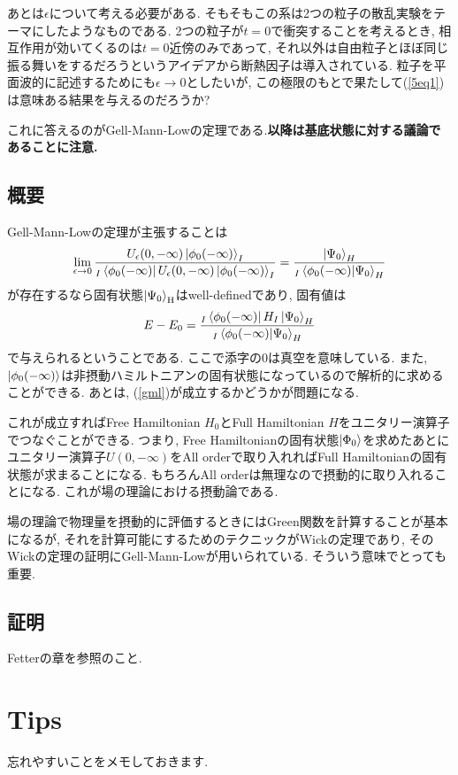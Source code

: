 \documentclass[10.5pt,a4paper]{jreport}
\begin{document}
あとは$\epsilon$について考える必要がある. そもそもこの系は2つの粒子の散乱実験をテーマにしたようなものである. 2つの粒子が$t = 0$で衝突することを考えるとき, 相互作用が効いてくるのは$t = 0$近傍のみであって, それ以外は自由粒子とほぼ同じ振る舞いをするだろうというアイデアから断熱因子は導入されている. 粒子を平面波的に記述するためにも$\epsilon\rightarrow 0$としたいが, この極限のもとで果たして(\ref{5eq1})は意味ある結果を与えるのだろうか?

これに答えるのがGell-Mann-Lowの定理である.\textbf{以降は基底状態に対する議論であることに注意.}
\subsection{概要}
Gell-Mann-Lowの定理が主張することは
\begin{eqnarray}
  \lim_{\epsilon\rightarrow0}\frac{U_\epsilon(0, -\infty)\ket{\phi_0(-\infty)}_I}{_I\bra{\phi_0(-\infty)}U_\epsilon(0, -\infty)\ket{\phi_0(-\infty)}_I} = \frac{\ket{\Psi_0}_H}{_I\expval{\phi_0(-\infty)|\Psi_0}_H}\label{gml}
\end{eqnarray}
が存在するなら固有状態$\ket{\Psi_0}_{\rm H}$はwell-definedであり, 固有値は
\begin{eqnarray}
  E-E_0 = \frac{_I\bra{\phi_0(-\infty)}H_I\ket{\Psi_0}_H}{_I\expval{\phi_0(-\infty)|\Psi_0}_H}
\end{eqnarray}
で与えられるということである. ここで添字の0は真空を意味している. また, $\ket{\phi_0(-\infty)}$は非摂動ハミルトニアンの固有状態になっているので解析的に求めることができる. あとは, (\ref{gml})が成立するかどうかが問題になる.

これが成立すればFree Hamiltonian $H_0$とFull Hamiltonian $H$をユニタリー演算子でつなぐことができる. つまり, Free Hamiltonianの固有状態$\ket{\Phi_0}$を求めたあとにユニタリー演算子$U(0, -\infty)$をAll orderで取り入れればFull Hamiltonianの固有状態が求まることになる. もちろんAll orderは無理なので摂動的に取り入れることになる. これが場の理論における摂動論である.

場の理論で物理量を摂動的に評価するときにはGreen関数を計算することが基本になるが, それを計算可能にするためのテクニックがWickの定理であり, そのWickの定理の証明にGell-Mann-Lowが用いられている. そういう意味でとっても重要. 
\subsection{証明}
Fetterの章を参照のこと. 
\section{Tips}
忘れやすいことをメモしておきます.
\end{document}

